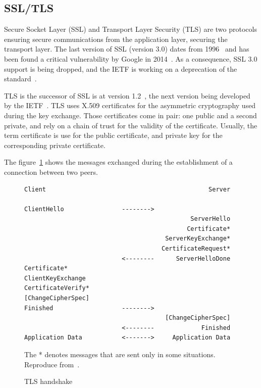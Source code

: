 \subsection{SSL/TLS}
Secure Socket Layer (SSL) and Transport Layer Security (TLS) are two protocols ensuring secure communications from the application layer, securing the transport layer.
The last version of SSL (version 3.0) dates from 1996~\cite{rfc6101} and has been found a critical vulnerability by Google in 2014~\cite{poodle}.
As a consequence, SSL 3.0 support is being dropped, and the IETF is working on a deprecation of the standard~\cite{sslv3-diediedie-03}.

\noindent TLS is the successor of SSL is at version 1.2~\cite{rfc5246}, the next version being developed by the IETF~\cite{tls13-05}.
TLS uses X.509 certificates for the asymmetric cryptography used during the key exchange.
Those certificates come in pair: one public and a second private, and rely on a chain of trust for the validity of the certificate.
Usually, the term certificate is use for the public certificate, and private key for the corresponding private certificate.

\noindent The figure~\ref{fig:tls-handshake} shows the messages exchanged during the establishment of a connection between two peers.


\begin{figure}[ht]
\begin{verbatim}
Client                                             Server

ClientHello                -------->
                                              ServerHello
                                             Certificate*
                                       ServerKeyExchange*
                                      CertificateRequest*
                           <--------      ServerHelloDone
Certificate*
ClientKeyExchange
CertificateVerify*
[ChangeCipherSpec]
Finished                   -------->
                                       [ChangeCipherSpec]
                           <--------             Finished
Application Data           <------->     Application Data
\end{verbatim}
\caption{TLS handshake}{The * denotes messages that are sent only in some situations. Reproduce from~\cite{rfc5246}.}
\label{fig:tls-handshake}
\end{figure}

